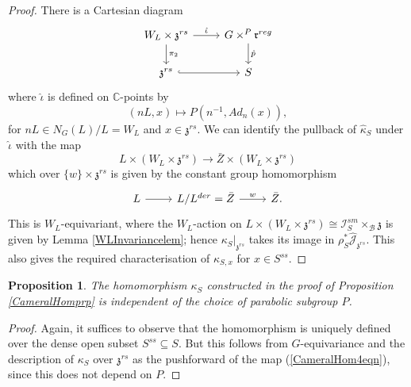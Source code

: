 \documentclass{amsart}
\newtheorem{proposition}[theorem]{Proposition}
\theoremstyle{remark}
\numberwithin{theorem}{section}
\numberwithin{equation}{section}
\begin{document}
\begin{proof}
There is a Cartesian diagram
\begin{equation}\label{CameralHom2eqn}
\begin{tikzcd}
W_L \times \mathfrak{z}^{rs} \arrow[d, "\pi_2"] \arrow[r, "\hat{\iota}"] & G \times^P \mathfrak{r}^{reg} \arrow[d, "\hat{p}"] \\
\mathfrak{z}^{rs} \arrow[r, hook]                                 & S                                                   
\end{tikzcd}
\end{equation}
where $\hat{\iota}$ is defined on $\mathbb{C}$-points by
\begin{equation}\label{CameralHom3eqn}
    (nL,x) \mapsto P(n^{-1},Ad_n(x)), 
\end{equation}
for $nL \in N_G(L)/L = W_L$ and $x \in \mathfrak{z}^{rs}$. We can identify the pullback of $\hat{\kappa}_S$ under $\hat{\iota}$ with the map
\begin{equation}\label{CameralHom4eqn}
    L \times (W_L \times \mathfrak{z}^{rs}) \rightarrow \bar{Z} \times (W_L \times \mathfrak{z}^{rs}) 
\end{equation}
which over $\{w\} \times \mathfrak{z}^{rs}$ is given by
the constant group homomorphism
\begin{equation}\label{CameralHom5eqn}
\begin{tikzcd}
L \arrow[r] & L/L^{der} = \bar{Z} \arrow[r, "w"] & \bar{Z}.
\end{tikzcd}  
\end{equation}
This is $W_L$-equivariant, where the $W_L$-action on $L \times (W_L \times \mathfrak{z}^{rs}) \cong \mathcal I_S^{sm} \times_{\mathcal B} \mathfrak{z}$ is given by Lemma \ref{WLInvariancelem}; hence $\kappa_S|_{\mathfrak{z}^{rs}}$ takes its image in $\rho_S^* \hat{\mathcal J}_{\mathfrak{z}^{rs}}$. This also gives the required characterisation of $\kappa_{S,x}$ for $x \in S^{ss}$.
\end{proof}

\begin{proposition}\label{CameralPindprp}
  The homomorphism $\kappa_S$ constructed in the proof of Proposition \ref{CameralHomprp} is independent of the choice of parabolic subgroup $P$.   
\end{proposition}

\begin{proof}
Again, it suffices to observe that the homomorphism is uniquely defined over the dense open subset $S^{ss} \subseteq S$. But this follows from $G$-equivariance and the description of $\kappa_S$ over $\mathfrak{z}^{rs}$ as the pushforward of the map (\ref{CameralHom4eqn}), since this does not depend on $P$.
\end{proof}
\end{document}

